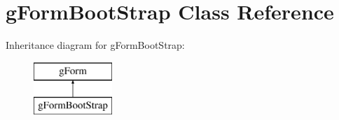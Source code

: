 \hypertarget{classg_form_boot_strap}{\section{g\-Form\-Boot\-Strap Class Reference}
\label{classg_form_boot_strap}
}
Inheritance diagram for g\-Form\-Boot\-Strap\-:\begin{figure}[H]
\begin{center}
\leavevmode
\includegraphics[height=2.000000cm]{classg_form_boot_strap}
\end{center}
\end{figure}
